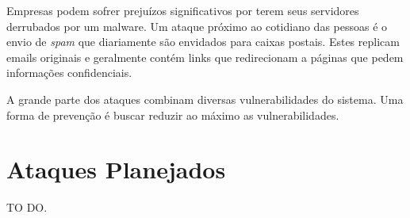 		Empresas podem sofrer prejuízos significativos por terem seus servidores derrubados por um malware. Um ataque próximo ao cotidiano das pessoas é o envio de \textit{spam}  que diariamente são envidados para caixas postais. Estes replicam emails originais e geralmente contém links que redirecionam a páginas que pedem informações confidenciais. 

		A grande parte dos ataques combinam diversas vulnerabilidades do sistema.
		Uma forma de prevenção é buscar reduzir ao máximo as vulnerabilidades.


	\section{Ataques Planejados}
	\label{sec:Seguranca_Planejamento}

		TO DO.

